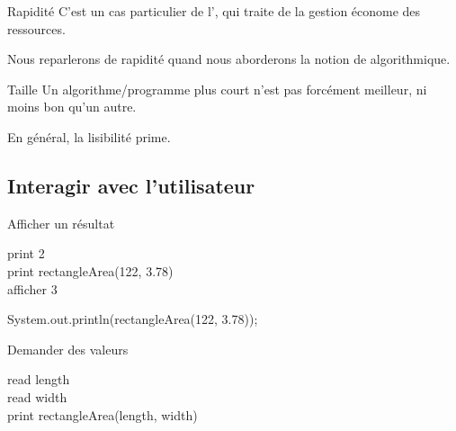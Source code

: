 \begin{hideedit}
\begin{frame}{Rapidité}
  \pause
  C'est un cas particulier de l', qui traite de la
  gestion économe des ressources.

  Nous reparlerons de rapidité quand nous aborderons la notion de
   algorithmique.

\end{frame}

\begin{frame}{Taille}
  Un algorithme/programme plus court n'est pas forcément meilleur, ni moins
  bon qu'un autre.

  En général, \alert{la lisibilité prime}.
\end{frame}


\subsection{Interagir avec l'utilisateur}
\begin{frame}[fragile]{Afficher un résultat}
  \begin{langagenaturel}
print 2\\
print rectangleArea(122, 3.78)\\

afficher 3
  \end{langagenaturel}

  \pause
  \begin{center}
  \end{center}

  \pause
  \begin{java}
System.out.println(rectangleArea(122, 3.78));
  \end{java}
\end{frame}

\begin{frame}[fragile]{Demander des valeurs}
  \begin{langagenaturel}
    read length\\
    read width\\
    print rectangleArea(length, width)\\


\end{langagenaturel}
\end{frame}
\end{hideedit}

